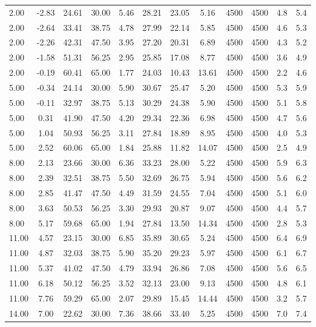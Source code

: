 \documentclass[english]{SPFShortReport}
\begin{document}
\begin{table}[!ht]
\begin{small}
\begin{center}
{\begin{tabular}{l | c c c c c c c c c c c }
2.00 & -2.83 & 24.61 & 30.00 & 5.46 & 28.21 & 23.05 & 5.16 & 4500 & 4500 & 4.8 & 5.4\\ 
2.00 & -2.64 & 33.41 & 38.75 & 4.78 & 27.99 & 22.14 & 5.85 & 4500 & 4500 & 4.6 & 5.3\\ 
2.00 & -2.26 & 42.31 & 47.50 & 3.95 & 27.20 & 20.31 & 6.89 & 4500 & 4500 & 4.3 & 5.2\\ 
2.00 & -1.58 & 51.31 & 56.25 & 2.95 & 25.85 & 17.08 & 8.77 & 4500 & 4500 & 3.6 & 4.9\\ 
2.00 & -0.19 & 60.41 & 65.00 & 1.77 & 24.03 & 10.43 & 13.61 & 4500 & 4500 & 2.2 & 4.6\\ 
5.00 & -0.34 & 24.14 & 30.00 & 5.90 & 30.67 & 25.47 & 5.20 & 4500 & 4500 & 5.3 & 5.9\\ 
5.00 & -0.11 & 32.97 & 38.75 & 5.13 & 30.29 & 24.38 & 5.90 & 4500 & 4500 & 5.1 & 5.8\\ 
5.00 & 0.31 & 41.90 & 47.50 & 4.20 & 29.34 & 22.36 & 6.98 & 4500 & 4500 & 4.7 & 5.6\\ 
5.00 & 1.04 & 50.93 & 56.25 & 3.11 & 27.84 & 18.89 & 8.95 & 4500 & 4500 & 4.0 & 5.3\\ 
5.00 & 2.52 & 60.06 & 65.00 & 1.84 & 25.88 & 11.82 & 14.07 & 4500 & 4500 & 2.5 & 4.9\\ 
8.00 & 2.13 & 23.66 & 30.00 & 6.36 & 33.23 & 28.00 & 5.22 & 4500 & 4500 & 5.9 & 6.3\\ 
8.00 & 2.39 & 32.51 & 38.75 & 5.50 & 32.69 & 26.75 & 5.94 & 4500 & 4500 & 5.6 & 6.2\\ 
8.00 & 2.85 & 41.47 & 47.50 & 4.49 & 31.59 & 24.55 & 7.04 & 4500 & 4500 & 5.1 & 6.0\\ 
8.00 & 3.63 & 50.53 & 56.25 & 3.30 & 29.93 & 20.87 & 9.07 & 4500 & 4500 & 4.4 & 5.7\\ 
8.00 & 5.17 & 59.68 & 65.00 & 1.94 & 27.84 & 13.50 & 14.34 & 4500 & 4500 & 2.8 & 5.3\\ 
11.00 & 4.57 & 23.15 & 30.00 & 6.85 & 35.89 & 30.65 & 5.24 & 4500 & 4500 & 6.4 & 6.9\\ 
11.00 & 4.87 & 32.03 & 38.75 & 5.90 & 35.20 & 29.23 & 5.97 & 4500 & 4500 & 6.1 & 6.7\\ 
11.00 & 5.37 & 41.02 & 47.50 & 4.79 & 33.94 & 26.86 & 7.08 & 4500 & 4500 & 5.6 & 6.5\\ 
11.00 & 6.18 & 50.12 & 56.25 & 3.52 & 32.13 & 23.00 & 9.13 & 4500 & 4500 & 4.8 & 6.1\\ 
11.00 & 7.76 & 59.29 & 65.00 & 2.07 & 29.89 & 15.45 & 14.44 & 4500 & 4500 & 3.2 & 5.7\\ 
14.00 & 7.00 & 22.62 & 30.00 & 7.36 & 38.66 & 33.40 & 5.25 & 4500 & 4500 & 7.0 & 7.4\\ 

\end{tabular}}
\end{center}
\end{small}
\end{table}
\end{document}
